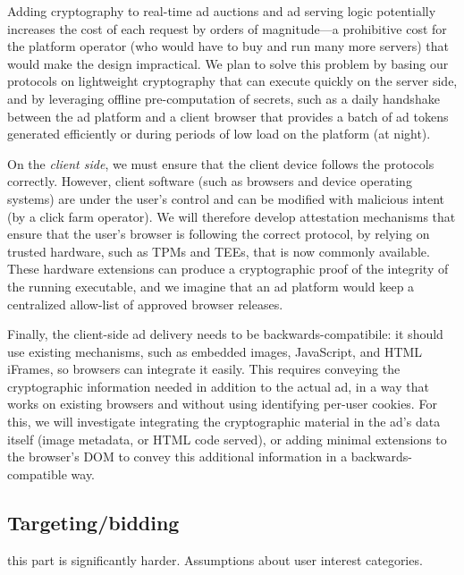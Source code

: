 %
Adding cryptography to real-time ad auctions and ad serving logic potentially increases the cost of each request by orders of magnitude---a prohibitive cost for the platform operator (who would have to buy and run many more servers) that would make the design impractical.
%
We plan to solve this problem by basing our protocols on lightweight cryptography that can execute quickly on the server side, and by leveraging offline pre-computation of secrets, such as a daily handshake between the ad platform and a client browser that provides a batch of ad tokens generated efficiently or during periods of low load on the platform (\eg at night).
%

%
On the \emph{client side}, we must ensure that the client device follows the protocols correctly.
%
However, client software (such as browsers and device operating systems) are under the user's control and can be modified with malicious intent (\eg by a click farm operator).
%
We will therefore develop attestation mechanisms that ensure that the user's browser is following the correct protocol, \eg by relying on trusted hardware, such as TPMs and TEEs, that is now commonly available.
%
These hardware extensions can produce a cryptographic proof of the integrity of the running executable, and we imagine that an ad platform would keep a centralized allow-list of approved browser releases.
%

%
Finally, the client-side ad delivery needs to be backwards-compatibile: it should use existing mechanisms, such as embedded images, JavaScript, and HTML iFrames, so browsers can integrate it easily.
%
This requires conveying the cryptographic information needed in addition to the actual ad, in a way that works on existing browsers and without using identifying per-user cookies.
%
For this, we will investigate integrating the cryptographic material in the ad's data itself (\eg image metadata, or HTML code served), or adding minimal extensions to the browser's DOM to convey this additional information in a backwards-compatible way.
%


\subsection{Targeting/bidding}
\label{r:matching}

this part is significantly harder.  Assumptions about user interest categories.

